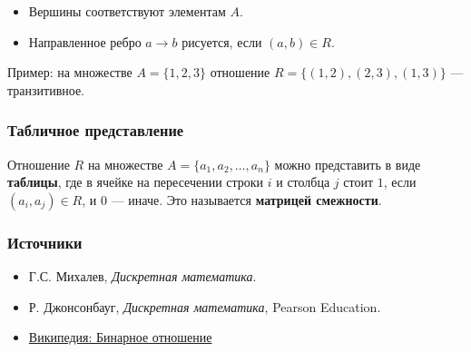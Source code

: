 \begin{itemize}[leftmargin=*]
  \item Вершины соответствуют элементам $A$.
  \item Направленное ребро $a \to b$ рисуется, если $(a,b) \in R$.
\end{itemize}

Пример: на множестве $A = \{1, 2, 3\}$ отношение $R = \{(1,2), (2,3), (1,3)\}$ — транзитивное.

\subsubsection{Табличное представление}

Отношение $R$ на множестве $A = \{a_1, a_2, \dots, a_n\}$ можно представить в виде \textbf{таблицы}, где в ячейке на пересечении строки $i$ и столбца $j$ стоит $1$, если $(a_i, a_j) \in R$, и $0$ — иначе. Это называется \textbf{матрицей смежности}.

\subsubsection{Источники}

\begin{itemize}
  \item Г.С. Михалев, \textit{Дискретная математика}.
  \item Р. Джонсонбауг, \textit{Дискретная математика}, Pearson Education.
  \item \href{https://ru.wikipedia.org/wiki/Бинарное_отношение}{Википедия: Бинарное отношение}
\end{itemize}